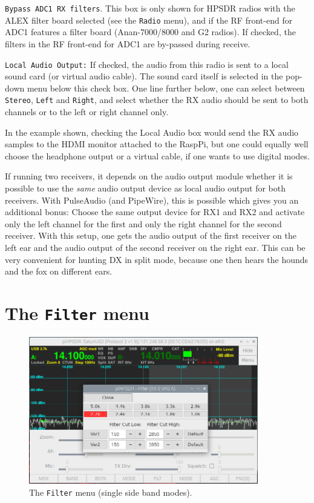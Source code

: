 \documentclass[12pt]{book}
\def\rett#1{\texttt{\color{red}#1}}
\def\bltt#1{\texttt{\color{blue}#1}}
\begin{document}
\rett{Bypass ADC1 RX filters}. This box is only shown for HPSDR radios with the ALEX filter board
selected (see the \bltt{Radio} menu), and if the RF front-end for ADC1
features a filter board (Anan-7000/8000 and G2 radios).
If checked, the filters in the RF front-end for ADC1
are by-passed during receive.

\rett{Local Audio Output:} If checked, the audio from this radio is sent to a local
sound card (or virtual audio cable). The sound card itself is selected in the
pop-down menu below this check box. One line further below, one can select between
\texttt{Stereo}, \texttt{Left} and \texttt{Right}, and select whether the RX
audio should be sent to both channels or to the left or right channel only.

In the example shown, checking the Local Audio box would send the RX audio
samples to the HDMI monitor attached to the RaspPi, but one could equally
well choose the headphone output or a virtual cable, if one wants to use
digital modes.

If running two receivers, it depends on the audio output module whether
it is possible to use the \textit{same} audio output device as local audio output
for both receivers. With PulseAudio (and PipeWire), this is possible which gives you an additional
bonus:
Choose the same output device for RX1 and RX2 and activate only
the left channel for the first and only the right channel for the second receiver.
With this setup,
one gets the audio output of the first receiver on the left ear and the audio output of
the second receiver on the right ear. This can be very convenient for hunting DX in split mode,
because one then hears the hounds and the fox on different ears.

\section{The \texttt{Filter} menu}

\begin{figure}[ht]
\center
\includegraphics[width=10cm]{FilterMenuUSB.png}
\caption{The \bltt{Filter} menu (single side band modes).}
\label{fig:FilterMenuUSB}
\end{figure}
\end{document}
